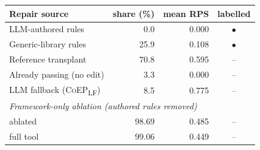 \begin{tabular}{lrrc}
\toprule
Repair source & share (\%) & mean RPS & labelled \\
\midrule
LLM-authored rules & 0.0 & 0.000 & $\bullet$ \\
Generic-library rules & 25.9 & 0.108 & $\bullet$ \\
Reference transplant & 70.8 & 0.595 & -- \\
Already passing (no edit) & 3.3 & 0.000 & -- \\
\midrule
LLM fallback (\textsc{CoEP}\textsubscript{LF}) & 8.5 & 0.775 & -- \\
\midrule
\multicolumn{4}{l}{\emph{Framework-only ablation (authored rules removed)}}\\
\quad ablated & 98.69 & 0.485 & -- \\
\quad full tool & 99.06 & 0.449 & -- \\
\bottomrule
\end{tabular}
